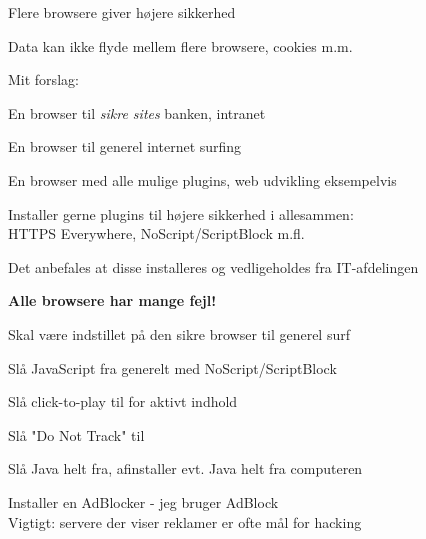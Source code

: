 \documentclass[18pt,landscape,a4paper,footrule]{foils}
\begin{document}








\begin{list1}
\item Flere browsere giver højere sikkerhed
\item Data kan ikke flyde mellem flere browsere, cookies m.m.
\item Mit forslag:
\begin{list2}
\item En browser til \emph{sikre sites} banken, intranet
\item En browser til generel internet surfing
\item En browser med alle mulige plugins, web udvikling eksempelvis
\end{list2}
\item Installer gerne plugins til højere sikkerhed i allesammen:\\
HTTPS Everywhere, NoScript/ScriptBlock m.fl.
\end{list1}

\vskip 1cm
\centerline{Det anbefales at disse installeres og vedligeholdes fra IT-afdelingen}


\vskip 1cm
\centerline{\bf\Large Alle browsere har mange fejl!}



\begin{list1}
\item Skal være indstillet på den sikre browser til generel surf
\begin{list2}
\item Slå JavaScript fra generelt med NoScript/ScriptBlock
\item Slå click-to-play til for aktivt indhold
\item Slå "Do Not Track" til
\item Slå Java helt fra, afinstaller evt. Java helt fra computeren
\item Installer en AdBlocker - jeg bruger AdBlock\\
Vigtigt: servere der viser reklamer er ofte mål for hacking
\end{list2}
\end{list1}
\end{document}
